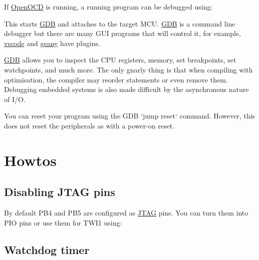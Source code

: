 If \url{OpenOCD} is running, a running program can be debugged using:

\begin{Shaded}
\begin{Highlighting}[]
\NormalTok{$ }
\end{Highlighting}
\end{Shaded}

This starts \url{GDB} and attaches to the target MCU. \url{GDB} is a
command line debugger but there are many GUI programs that will control
it, for example, \url{vscode} and \url{geany} have plugins.

\url{GDB} allows you to inspect the CPU registers, memory, set
breakpoints, set watchpoints, and much more. The only gnarly thing is
that when compiling with optimisation, the compiler may reorder
statements or even remove them. Debugging embedded systems is also made
difficult by the asynchronous nature of I/O.

You can reset your program using the GDB `jump reset` command. However,
this does not reset the peripherals as with a power-on reset.

\section{Howtos}
\label{howtos}

\subsection{Disabling JTAG pins}
\label{disabling-jtag-pins}

By default PB4 and PB5 are configured as \url{JTAG} pins. You can turn
them into PIO pins or use them for TWI1 using:
%
\begin{Shaded}
\begin{Highlighting}[]

\NormalTok{)}
\NormalTok{\{}
\NormalTok{\}}
\end{Highlighting}
\end{Shaded}

\subsection{Watchdog timer}
\label{watchdog-timer}

